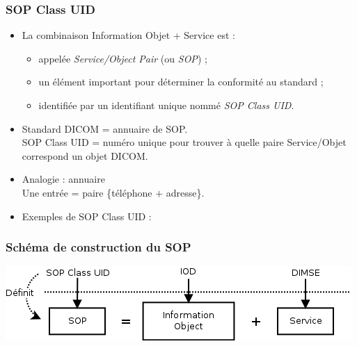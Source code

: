 	\frame
	{
		\frametitle{SOP Class UID}

		\begin{itemize}
			\item La combinaison Information Objet + Service est :
			\begin{itemize}
				\item<2-> appel\'ee \emph{Service/Object Pair} (ou \emph{SOP}) ;
				\item<3-> un \'el\'ement important pour d\'eterminer la conformit\'e au standard ;
				\item<4-> identifi\'ee par un identifiant unique nomm\'e \emph{SOP Class UID}.
			\end{itemize}
		
			\item<5-> Standard DICOM = annuaire de SOP.\\
			SOP Class UID = num\'ero unique pour trouver \`a quelle paire Service/Objet correspond un objet DICOM.
			\item<6-> Analogie : annuaire\\
			Une entr\'ee = paire \{t\'el\'ephone $+$ adresse\}.
			\item<7-> Exemples de SOP Class UID :
		\end{itemize}
	}
	
	\frame
	{
		\frametitle{Sch\'ema de construction du SOP}
		\begin{center}
			\includegraphics[width=\linewidth]{./figures/sop-definition.png}
		\end{center}		
	}

